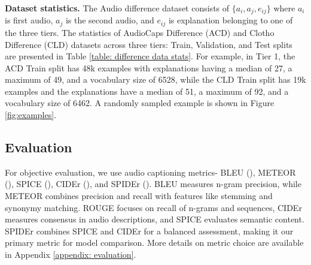 \noindent \textbf{Dataset statistics.} The Audio difference dataset consists of $\{a_i, a_j, e_{ij}\}$ where $a_i$ is first audio, $a_j$ is the second audio, and $e_{ij}$ is explanation belonging to one of the three tiers. The statistics of AudioCaps Difference (ACD) and Clotho Difference (CLD) datasets across three tiers: Train, Validation, and Test splits are presented in Table \ref{table: difference data stats}. For example, in Tier 1, the ACD Train split has 48k examples with explanations having a median of 27, a maximum of 49, and a vocabulary size of 6528, while the CLD Train split has 19k examples and the explanations have a median of 51, a maximum of 92, and a vocabulary size of 6462. A randomly sampled example is shown in Figure \ref{fig:examples}.

 \vspace{-0.1in}
\subsection{Evaluation} \label{subsec: metrics} \vspace{-0.1in}
For objective evaluation, we use audio captioning metrics- BLEU (\cite{bleu}), METEOR (\cite{meteor}), SPICE (\cite{spice}), CIDEr (\cite{cider}), and SPIDEr (\cite{spider}). BLEU measures n-gram precision, while METEOR combines precision and recall with features like stemming and synonymy matching. ROUGE focuses on recall of n-grams and sequences, CIDEr measures consensus in audio descriptions, and SPICE evaluates semantic content. SPIDEr combines SPICE and CIDEr for a balanced assessment, making it our primary metric for model comparison. More details on metric choice are available in Appendix \ref{appendix: evaluation}.